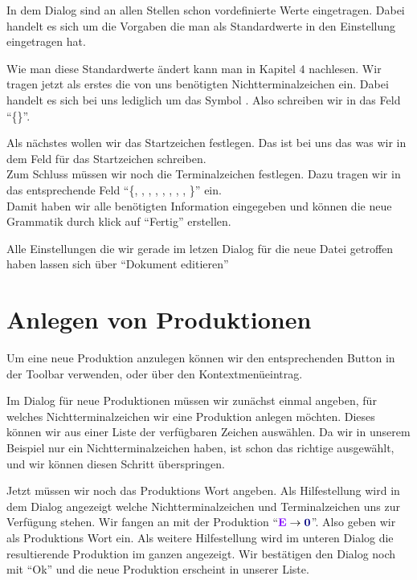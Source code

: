 In dem Dialog sind an allen Stellen schon vordefinierte Werte eingetragen.
Dabei handelt es sich um die Vorgaben die man als Standardwerte in den Einstellung eingetragen hat.

Wie man diese Standardwerte ändert kann man in Kapitel $4$ nachlesen. Wir tragen
jetzt als erstes die von uns benötigten Nichtterminalzeichen ein. Dabei handelt
es sich bei uns lediglich um das Symbol . Also schreiben wir in
das Feld "`\{\}"'.\vspace{10pt}

Als nächstes wollen wir das Startzeichen festlegen. Das ist bei uns das 
was wir in dem Feld für das Startzeichen schreiben.\\
Zum Schluss müssen wir noch die Terminalzeichen festlegen. Dazu tragen
wir in das entsprechende Feld "`\{, ,
, , \TerminalSymbol{-}, \TerminalSymbol{+},
\TerminalSymbol{*}, \TerminalSymbol{(}, \TerminalSymbol{)}\}"' ein.\\ Damit
haben wir alle benötigten Information eingegeben und können die neue Grammatik durch klick auf "`Fertig"' erstellen.\vspace{10pt}

Alle Einstellungen die wir gerade im letzen Dialog für die neue Datei getroffen
haben lassen sich über "`Dokument editieren"'

\section{Anlegen von Produktionen}

Um eine neue Produktion anzulegen können wir den entsprechenden Button in der
Toolbar verwenden, oder über den Kontextmenüeintrag.\vspace{10pt}

Im Dialog für neue Produktionen müssen wir zunächst einmal angeben, für welches
Nichtterminalzeichen wir eine Produktion anlegen möchten. Dieses können wir aus
einer Liste der verfügbaren Zeichen auswählen. Da wir in unserem Beispiel nur
ein Nichtterminalzeichen haben, ist schon das richtige ausgewählt, und wir
können diesen Schritt überspringen.\vspace{10pt}

Jetzt müssen wir noch das Produktions Wort angeben. Als Hilfestellung wird in
dem Dialog angezeigt welche Nichtterminalzeichen und Terminalzeichen uns zur
Verfügung stehen. Wir fangen an mit der Produktion "`$\StartSymbol{E} \to
\TerminalSymbol{0}$"'. Also geben wir als Produktions Wort 
ein. Als weitere Hilfestellung wird im unteren Dialog die resultierende Produktion im ganzen angezeigt. Wir bestätigen den
Dialog noch mit "`Ok"' und die neue Produktion erscheint in unserer Liste.\vspace{10pt}

